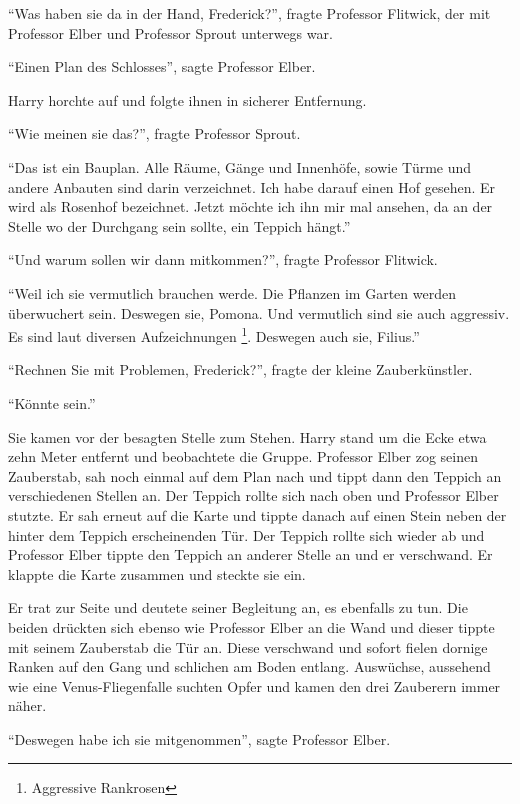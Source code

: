 \enquote{Was haben sie da in der Hand, Frederick?}, fragte Professor Flitwick, der mit Professor Elber und Professor Sprout unterwegs war.

\enquote{Einen Plan des Schlosses}, sagte Professor Elber.

Harry horchte auf und folgte ihnen in sicherer Entfernung.

\enquote{Wie meinen sie das?}, fragte Professor Sprout.

\enquote{Das ist ein Bauplan. Alle Räume, Gänge und Innenhöfe, sowie Türme und andere Anbauten sind darin verzeichnet. Ich habe darauf einen Hof gesehen. Er wird als Rosenhof bezeichnet. Jetzt möchte ich ihn mir mal ansehen, da an der Stelle wo der Durchgang sein sollte, ein Teppich hängt.}

\enquote{Und warum sollen wir dann mitkommen?}, fragte Professor Flitwick.

\enquote{Weil ich sie vermutlich brauchen werde. Die Pflanzen im Garten werden überwuchert sein. Deswegen sie, Pomona. Und vermutlich sind sie auch aggressiv. Es sind laut diversen Aufzeichnungen \footnote{Aggressive Rankrosen}. Deswegen auch sie, Filius.}

\enquote{Rechnen Sie mit Problemen, Frederick?}, fragte der kleine Zauberkünstler.

\enquote{Könnte sein.}

Sie kamen vor der besagten Stelle zum Stehen. Harry stand um die Ecke etwa zehn Meter entfernt und beobachtete die Gruppe. Professor Elber zog seinen Zauberstab, sah noch einmal auf dem Plan nach und tippt dann den Teppich an verschiedenen Stellen an. Der Teppich rollte sich nach oben und Professor Elber stutzte. Er sah erneut auf die Karte und tippte danach auf einen Stein neben der hinter dem Teppich erscheinenden Tür. Der Teppich rollte sich wieder ab und Professor Elber tippte den Teppich an anderer Stelle an und er verschwand. Er klappte die Karte zusammen und steckte sie ein.

Er trat zur Seite und deutete seiner Begleitung an, es ebenfalls zu tun. Die beiden drückten sich ebenso wie Professor Elber an die Wand und dieser tippte mit seinem Zauberstab die Tür an. Diese verschwand und sofort fielen dornige Ranken auf den Gang und schlichen am Boden entlang. Auswüchse, aussehend wie eine Venus-Fliegenfalle suchten Opfer und kamen den drei Zauberern immer näher.

\enquote{Deswegen habe ich sie mitgenommen}, sagte Professor Elber.


